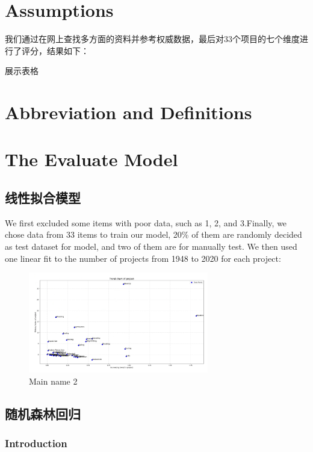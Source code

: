 \documentclass[a4paper]{article}
\begin{document}
\section{Assumptions}
我们通过在网上查找多方面的资料并参考权威数据，最后对33个项目的七个维度进行了评分，结果如下：

展示表格

\section{Abbreviation and Definitions}
\section{The Evaluate Model}
\subsection{线性拟合模型}
We first excluded some items with poor data, such as 1, 2, and 3.Finally, we chose data from 33 items to train our model, 20\% of them are randomly decided as test dataset for model, and two of them are for manually test.
We then used one linear fit to the number of projects from 1948 to 2020 for each project:
\captionsetup[listing]{labelformat=empty}
\begin{figure}[H] %
    \centering %
    \includegraphics[width=0.7\textwidth]{TrendChartOfProject} %
    \caption{Main name 2} %
    \label{Fig.main2} %
    \end{figure}

\subsection{随机森林回归}
\subsubsection{Introduction}
\end{document}
